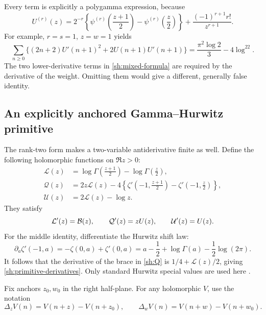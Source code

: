 Every term is explicitly a polygamma expression, because
\begin{equation}\label{sh:polygamma}
 U^{(r)}(z)=2^{-r}\left\{
   \psi^{(r)}\left(\frac{z+1}{2}\right)
  -\psi^{(r)}\left(\frac z2\right)\right\}
       +\frac{(-1)^{r+1}r!}{z^{r+1}}.
\end{equation}
For example, $r=s=1$, $z=w=1$ yields
\begin{equation}\label{sh:derivative-example}
 \sum_{n\ge0}\{(2n+2)U'(n+1)^2+2U(n+1)U'(n+1)\}
        =\frac{\pi^2\log2}{3}-4\log^22.
\end{equation}
The two lower-derivative terms in \eqref{sh:mixed-formula} are
required by the derivative of the weight. Omitting them would give
a different, generally false identity.

\subsection{An explicitly anchored Gamma--Hurwitz primitive}

The rank-two form makes a two-variable antiderivative finite as well.
Define the following holomorphic functions on $\Re z>0$:
\begin{align}
 \mathcal L(z)&=\log\Gamma\left(\frac{z+1}{2}\right)
                         -\log\Gamma\left(\frac z2\right),\label{sh:L}\\
 \mathcal Q(z)&=2z\mathcal L(z)-4\left\{
 \zeta'\left(-1,\frac{z+1}{2}\right)
                   -\zeta'\left(-1,\frac z2\right)\right\},\label{sh:Q}\\
 \mathcal U(z)&=2\mathcal L(z)-\log z.\label{sh:primitiveU}
\end{align}
They satisfy
\begin{equation}\label{sh:primitive-derivatives}
 \mathcal L'(z)=\mathcal B(z),\qquad
 \mathcal Q'(z)=zU(z),\qquad
 \mathcal U'(z)=U(z).
\end{equation}
For the middle identity, differentiate the Hurwitz shift law:
\[
 \partial_a\zeta'(-1,a)=-\zeta(0,a)+\zeta'(0,a)
        =a-\frac12+\log\Gamma(a)-\frac12\log(2\pi).
\]
It follows that the derivative of the brace in \eqref{sh:Q} is
$1/4+\mathcal L(z)/2$, giving \eqref{sh:primitive-derivatives}.
Only standard Hurwitz special values are used here \cite{DLMFZeta}.

Fix anchors $z_0,w_0$ in the right half-plane. For any holomorphic
$V$, use the notation
\[
 \Delta_zV(n)=V(n+z)-V(n+z_0),\qquad
 \Delta_wV(n)=V(n+w)-V(n+w_0).
\]

